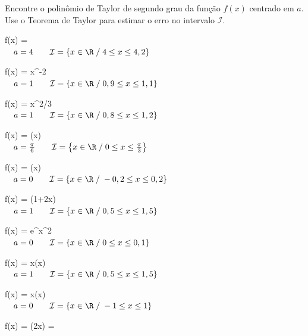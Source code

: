 \begin{exercises}

\begin{exercise}
	Encontre o polinômio de Taylor de segundo grau da função $f(x)$ centrado em $a$.
	Use o Teorema de Taylor para estimar o erro no intervalo $\mathcal{I}$.
	\begin{mathlist}
		\item f(x) =  \) \\[2mm]
		\(
			\quad a = 4 \qquad
 			\mathcal{I} =\{x\in\R\;/\; 4   \leq x \leq 4,2 \}
		\)
		\item f(x) = x^{-2} \) \\[2mm]
		\(
			\quad a = 1 \qquad
		  \mathcal{I} =\{x\in\R\;/\; 0,9 \leq x \leq 1,1 \}
    \)
		\item f(x) = x^{2/3} \) \\[2mm]
		\(
			\quad a = 1 \qquad
			\mathcal{I} =\{x\in\R\;/\; 0,8 \leq x \leq 1,2 \}
		\)
		\item f(x) = \sin(x) \) \\[2mm]
		\(
			\quad a = \frac{\pi}{6} \qquad
			\mathcal{I} =\left\{x\in\R\;/\; 0   \leq x \leq \frac{\pi}{3} \right\}
		\)
		\item f(x) = \sec(x) \) \\[2mm]
		\(
			\quad a = 0 \qquad
 			\mathcal{I} =\{x\in\R\;/\;-0,2 \leq x \leq 0,2 \}
		\)
		\item f(x) = \ln(1+2x) \) \\[2mm]
		\(
			\quad a = 1 \qquad
			\mathcal{I} =\{x\in\R\;/\;0,5 \leq x \leq 1,5 \} \)
		\item f(x) = e^{x^2} \) \\[2mm]
		\(
			\quad a = 0 \qquad
			\mathcal{I} =\{x\in\R\;/\; 0   \leq x \leq 0,1 \}
		\)
		\item f(x) = x\ln(x) \) \\[2mm]
		\(
			\quad a = 1 \qquad
			\mathcal{I} =\{x\in\R\;/\;0,5 \leq x \leq 1,5 \}
 		\)
		\item f(x) = x\sin(x) \) \\[2mm]
		\(
			\quad a = 0 \qquad
			\mathcal{I} =\{x\in\R\;/\;-1  \leq x \leq 1   \}
		\)
		\item f(x) = \sinh(2x) =  \) \\[2mm]

\end{mathlist}
\end{exercise}
\end{exercises}
